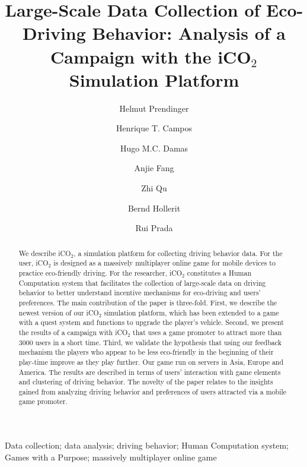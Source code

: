 \documentclass[preprint,authoryear,12pt]{elsarticle}
\date{}
\begin{document}
\begin{frontmatter}
\title{Large-Scale Data Collection of Eco-Driving Behavior:
Analysis of a Campaign with the iCO$_2$ Simulation Platform}

\author[label1]{Helmut Prendinger}
\author[label2]{Henrique T. Campos}
\author[label2]{Hugo M.C. Damas}
\author[label1]{Anjie Fang}
\author[label1]{Zhi Qu}
\author[label1]{Bernd Hollerit}
\author[label2]{Rui Prada}



\address[label1]{{helmut@nii.ac.jp, fanganjie@gmail.com, hollerit@gmail.com, zq12721@my.bristol.ac.uk}\\
	National Institute of Informatics, \\
    2-1-2 Hitotsubashi, Chiyoda-ku, Tokyo, 101-8430, Japan\\}

\address[label2]{{henriquetcampos@gmail.com,hugo.damas@gmail.com,rui.prada@tecnico.ulisboa.pt}\\
    INESC-ID and Instituto Superior T\'{e}cnico, Universidade de Lisboa,\\
    Av. Prof. Cavaco Silva, Taguspark Porto Salvo, Portugal\\}


\begin{abstract}
We describe iCO$_2$, a simulation platform for collecting driving behavior data. For the user, iCO$_2$ is designed as a massively multiplayer online game for mobile devices to practice eco-friendly driving. For the researcher, iCO$_2$ constitutes a Human Computation system that facilitates the collection of large-scale data on driving behavior to better understand incentive mechanisms for eco-driving and users' preferences. The main contribution of the paper is three-fold. First, we describe the newest version of our iCO$_2$ simulation platform, which has been extended to a game with a quest system and functions to upgrade the player's vehicle. Second, we present the results of a campaign with iCO$_2$ that uses a game promoter to attract more than 3000 users in a short time. Third, we validate the hypothesis that using our feedback mechanism the players who appear to be less eco-friendly in the beginning of their play-time improve as they play further.
Our game run on servers in Asia, Europe and America. The results are described in terms of users' interaction with game elements and clustering of driving behavior. The novelty of the paper relates to the insights gained from analyzing driving behavior and preferences of users attracted via a mobile game promoter.
\end{abstract}

\begin{keyword}
Data collection; data analysis; driving behavior; Human Computation system; Games with a Purpose; massively multiplayer online game
\end{keyword}

\end{frontmatter}
\end{document}
